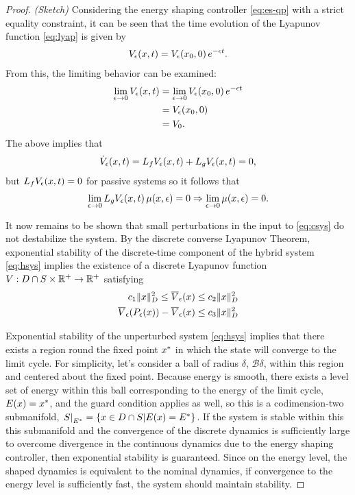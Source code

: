 \begin{proof}
  {\em (Sketch)} Considering the energy shaping controller \eqref{eq:es-qp} with a strict equality constraint, it can be seen that the time evolution of the Lyapunov function \eqref{eq:lyap} is given by
  \begin{align*}
    V_{\epsilon}(x, t) = V_{\epsilon}(x_{0}, 0) \, e^{-\epsilon t}.
  \end{align*}
  From this, the limiting behavior can be examined:
  \begin{align*}
    \lim_{\epsilon \to 0} V_{\epsilon}(x, t) &= \lim_{\epsilon \to 0} V_{\epsilon}(x_{0}, 0) \, e^{-\epsilon t}\\
    &= V_{\epsilon}(x_{0}, 0)\\
    &= V_0.
  \end{align*}
  The above implies that
  \begin{align*}
    {\dot V}_{\epsilon}(x, t) = L_{f} V_{\epsilon}(x, t) + L_{g} V_{\epsilon}(x, t) = 0,
  \end{align*}
  but $L_{f} V_{\epsilon}(x, t) = 0$ for passive systems so it follows that
  \begin{align*}
    \lim_{\epsilon \to 0} L_{g} V_{\epsilon}(x, t) \, \mu(x, \epsilon) = 0 \Rightarrow \lim_{\epsilon \to 0} \mu(x, \epsilon) = 0.
  \end{align*}

  It now remains to be shown that small perturbations in the input to \eqref{eq:csys} do not destabilize the system.
  By the discrete converse Lyapunov Theorem, exponential stability of the discrete-time component of the hybrid system \eqref{eq:hsys} implies the existence of a discrete Lyapunov function $V : D \cap S \times \mathbb{R}^{+} \to \mathbb{R}^{+}$ satisfying
  \begin{align*}
    c_{1} \| x \|^{2}_{D} \leq \overline{V}_{\epsilon}(x) \leq c_{2} \| x \|_{D}^2\\
    \overline{V}_{\epsilon}(P_{\epsilon}(x)) - \overline{V}_{\epsilon}(x) \leq c_{3} \| x \|^{2}_{D}
  \end{align*}

  Exponential stability of the unperturbed system \eqref{eq:hsys} implies that there exists a region round the fixed point $x^{*}$ in which the state will converge to the limit cycle.
  For simplicity, let's consider a ball of radius $\delta$, $\mathcal{B}\delta$, within this region and centered about the fixed point.
  Because energy is smooth, there exists a level set of energy within this ball corresponding to the energy of the limit cycle, $E(x) = x^{*}$, and the guard condition applies as well, so this is a codimension-two submanifold, $\left.S\right|_{E^{*}} = \{ x \in D \cap S | E(x) = E^{*} \}$.
  If the system is stable within this this submanifold and the convergence of the discrete dynamics is sufficiently large to overcome divergence in the continuous dynamics due to the energy shaping controller, then exponential stability is guaranteed.
  Since on the energy level, the shaped dynamics is equivalent to the nominal dynamics, if convergence to the energy level is sufficiently fast, the system should maintain stability.



\end{proof}
